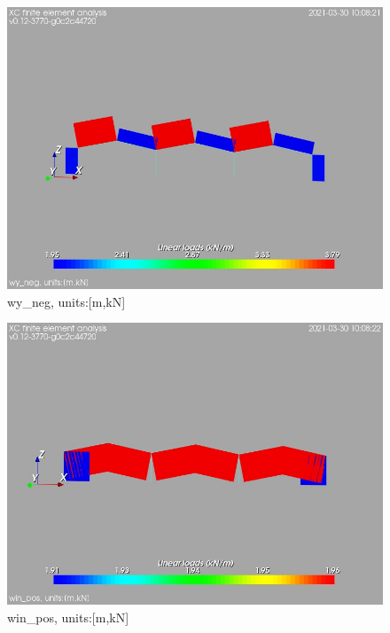 \begin{figure}
\begin{center}
\includegraphics[width=\linewidth]{calc_results/sole_zeinali/text/graphics/loads/wy_negallMemberSet}
\caption{wy_neg, units:[m,kN]}
\label{wy-neg-unitsmkn}
\end{center}
\end{figure}
\begin{figure}
\begin{center}
\includegraphics[width=\linewidth]{calc_results/sole_zeinali/text/graphics/loads/win_posallMemberSet}
\caption{win_pos, units:[m,kN]}
\label{win-pos-unitsmkn}
\end{center}
\end{figure}
